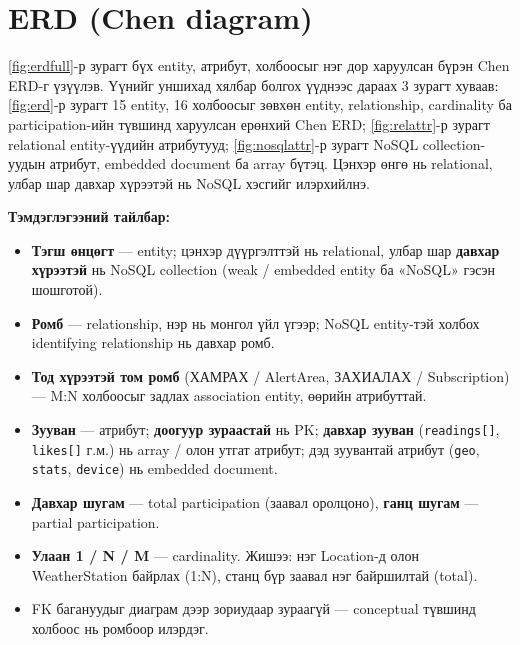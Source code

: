 \documentclass[12pt,a4paper]{article}
\begin{document}
\section{ERD (Chen diagram)}
\ref{fig:erdfull}-р зурагт бүх entity, атрибут, холбоосыг нэг дор харуулсан бүрэн
Chen ERD-г үзүүлэв. Үүнийг уншихад хялбар болгох үүднээс дараах 3 зурагт хуваав:
\ref{fig:erd}-р зурагт 15 entity, 16 холбоосыг зөвхөн entity, relationship,
cardinality ба participation-ийн түвшинд харуулсан ерөнхий Chen ERD;
\ref{fig:relattr}-р зурагт relational entity-үүдийн атрибутууд;
\ref{fig:nosqlattr}-р зурагт NoSQL collection-уудын атрибут, embedded document
ба array бүтэц. Цэнхэр өнгө нь relational, улбар шар давхар хүрээтэй нь NoSQL
хэсгийг илэрхийлнэ.

\noindent\textbf{Тэмдэглэгээний тайлбар:}
\begin{itemize}
  \item \textbf{Тэгш өнцөгт} — entity; цэнхэр дүүргэлттэй нь relational, улбар шар \textbf{давхар хүрээтэй} нь NoSQL collection (weak / embedded entity ба «NoSQL» гэсэн шошготой).
  \item \textbf{Ромб} — relationship, нэр нь монгол үйл үгээр; NoSQL entity-тэй холбох identifying relationship нь давхар ромб.
  \item \textbf{Тод хүрээтэй том ромб} (ХАМРАХ / AlertArea, ЗАХИАЛАХ / Subscription) — M:N холбоосыг задлах association entity, өөрийн атрибуттай.
  \item \textbf{Зууван} — атрибут; \textbf{доогуур зураастай} нь PK; \textbf{давхар зууван} (\texttt{readings[]}, \texttt{likes[]} г.м.) нь array / олон утгат атрибут; дэд зуувантай атрибут (\texttt{geo}, \texttt{stats}, \texttt{device}) нь embedded document.
  \item \textbf{Давхар шугам} — total participation (заавал оролцоно), \textbf{ганц шугам} — partial participation.
  \item \textbf{Улаан 1 / N / M} — cardinality. Жишээ: нэг Location-д олон WeatherStation байрлах (1:N), станц бүр заавал нэг байршилтай (total).
  \item FK багануудыг диаграм дээр зориудаар зураагүй — conceptual түвшинд холбоос нь ромбоор илэрдэг.
\end{itemize}
\end{document}
